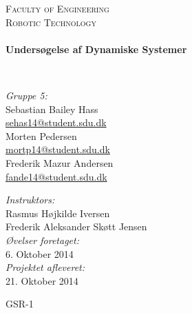 \begin{titlepage}
\begin{center}




\textsc{\huge \color{sdu_grey} Faculty of Engineering}\\[0.5cm]

\textsc{\LARGE \color{sdu_grey} Robotic Technology}\\[0.5cm]

\HRule \\[1ex]
{ \Huge \bfseries Undersøgelse af Dynamiske Systemer \\[1ex] }

\HRule \\[1.5cm]

\begin{minipage}{0.50\textwidth}
\begin{flushleft}\large
\emph{Gruppe 5:}\\
Sebastian Bailey Hass \\
\href{mailto:sehas14@student.sdu.dk}{\color{sdu_blue}sehas14@student.sdu.dk}\\
Morten Pedersen\\
\href{mailto:mortp14@student.sdu.dk}{\color{sdu_blue}mortp14@student.sdu.dk}\\
Frederik Mazur Andersen\\
\href{mailto:fande14@student.sdu.dk}{\color{sdu_blue}fande14@student.sdu.dk}\\
\end{flushleft}
\end{minipage}
\begin{minipage}[c][2cm]{0.45\textwidth}
\begin{flushright} \large
\vspace{2cm}
\emph{Instruktors:} \\
Rasmus Højkilde Iversen  \\
Frederik Aleksander Skøtt Jensen \\
\vspace{2cm}
\emph{Øvelser foretaget:} \\
6. Oktober 2014 \\
\emph{Projektet afleveret:} \\
21. Oktober 2014
\end{flushright}
\end{minipage}

\vfill

{\Large GSR-1}
\end{center}
\end{titlepage}
